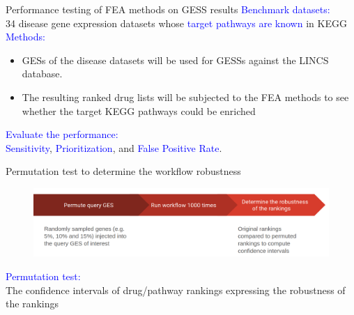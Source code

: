 \documentclass[10pt]{beamer}
\begin{document}
\begin{frame}{Performance testing of FEA methods on GESS results}
\vspace{-0.4cm}
\textcolor{blue}{Benchmark datasets:} \\
34 disease gene expression datasets whose \textcolor{blue}{target pathways are known} in KEGG \textcolor{gray}{\cite{Dong2016-ve}} \\
\vspace{0.2cm}
\textcolor{blue}{Methods:} \\
\begin{itemize}
    \item GESs of the disease datasets will be used for GESSs against the LINCS database.
    \item The resulting ranked drug lists will be subjected to the FEA methods to see whether the target KEGG pathways could be enriched
\end{itemize}
\textcolor{blue}{Evaluate the performance:} \\ \textcolor{blue}{Sensitivity}, \textcolor{blue}{Prioritization}, and \textcolor{blue}{False Positive Rate}. \textcolor{gray}{\cite{Tarca2013-lv}} 
\end{frame}
\begin{frame}{Permutation test to determine the workflow robustness}
\vspace{-1cm}
    \begin{figure}
        \includegraphics[width=12cm]{demo/images/perm_wkfl.png}
    \end{figure}
    \textcolor{blue}{Permutation test:}\\
The confidence intervals of drug/pathway rankings expressing the robustness of the rankings \\
\end{frame}
\end{document}
